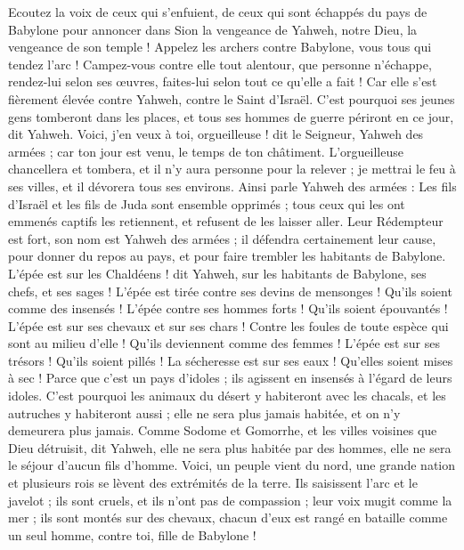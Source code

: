 \begin{multicols}{2}
Ecoutez la voix de ceux qui s'enfuient, de ceux qui sont échappés du pays de Babylone pour annoncer dans Sion la vengeance de Yahweh, notre Dieu, la vengeance de son temple !
Appelez les archers contre Babylone, vous tous qui tendez l'arc ! Campez-vous contre elle tout alentour, que personne n'échappe, rendez-lui selon ses œuvres, faites-lui selon tout ce qu'elle a fait ! Car elle s'est fièrement élevée contre Yahweh, contre le Saint d'Israël.
C'est pourquoi ses jeunes gens tomberont dans les places, et tous ses hommes de guerre périront en ce jour, dit Yahweh.
Voici, j'en veux à toi, orgueilleuse ! dit le Seigneur, Yahweh des armées ; car ton jour est venu, le temps de ton châtiment.
L'orgueilleuse chancellera et tombera, et il n'y aura personne pour la relever ; je mettrai le feu à ses villes, et il dévorera tous ses environs.
Ainsi parle Yahweh des armées : Les fils d'Israël et les fils de Juda sont ensemble opprimés ; tous ceux qui les ont emmenés captifs les retiennent, et refusent de les laisser aller.
Leur Rédempteur est fort, son nom est Yahweh des armées ; il défendra certainement leur cause, pour donner du repos au pays, et pour faire trembler les habitants de Babylone.
L'épée est sur les Chaldéens ! dit Yahweh, sur les habitants de Babylone, ses chefs, et ses sages !
L'épée est tirée contre ses devins de mensonges ! Qu'ils soient comme des insensés ! L'épée contre ses hommes forts ! Qu'ils soient épouvantés !
L'épée est sur ses chevaux et sur ses chars ! Contre les foules de toute espèce qui sont au milieu d'elle ! Qu'ils deviennent comme des femmes ! L'épée est sur ses trésors ! Qu'ils soient pillés !
La sécheresse est sur ses eaux ! Qu'elles soient mises à sec ! Parce que c'est un pays d'idoles ; ils agissent en insensés à l'égard de leurs idoles.
C'est pourquoi les animaux du désert y habiteront avec les chacals, et les autruches y habiteront aussi ; elle ne sera plus jamais habitée, et on n'y demeurera plus jamais.
Comme Sodome et Gomorrhe, et les villes voisines que Dieu détruisit, dit Yahweh, elle ne sera plus habitée par des hommes, elle ne sera le séjour d'aucun fils d'homme.
Voici, un peuple vient du nord, une grande nation et plusieurs rois se lèvent des extrémités de la terre.
Ils saisissent l'arc et le javelot ; ils sont cruels, et ils n'ont pas de compassion ; leur voix mugit comme la mer ; ils sont montés sur des chevaux, chacun d'eux est rangé en bataille comme un seul homme, contre toi, fille de Babylone !

\end{multicols}
